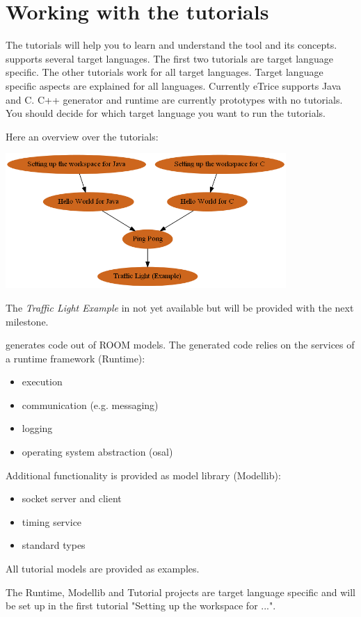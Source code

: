 \section{Working with the tutorials}

The \eTrice{} tutorials will help you to learn and understand the \eTrice{} tool and its concepts. \eTrice{} supports 
several target languages. 
The first two tutorials are target language specific. The other tutorials work for all target languages. Target language specific aspects are explained for all languages. 
Currently eTrice supports Java and C. C++ generator and runtime are currently prototypes with no tutorials. You should decide for which target language you want to run the tutorials. 

Here an overview over the tutorials:

\includegraphics[width=0.8\textwidth]{images/012-tutorial-structure.png}

The \emph{Traffic Light Example} in not yet available but will be provided with the next \eTrice{} milestone.

\eTrice{} generates code out of ROOM models. The generated code relies on the services of a runtime 
framework (Runtime):
\begin{itemize}
\item execution
\item communication (e.g. messaging)
\item logging
\item operating system abstraction (osal)
\end{itemize}

Additional functionality is provided as model library (Modellib): 
\begin{itemize}
\item socket server and client
\item timing service
\item standard types
\end{itemize}

All tutorial models are provided as examples.
 
The Runtime, Modellib and Tutorial projects are target language specific and will be set up in the first tutorial "Setting up the workspace for ...". 
 